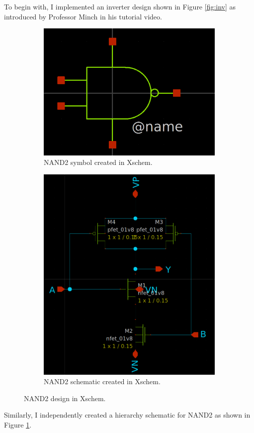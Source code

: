 \documentclass[11pt]{article}
\begin{document}
    To begin with, I implemented an inverter design shown in Figure \ref{fig:inv} as introduced by Professor Minch in his tutorial video.
    \begin{figure}[!ht]
        \begin{subfigure}{0.5\linewidth}
            \includegraphics[width=\linewidth]{../img/NAND2_sym.png}
            \caption{NAND2 symbol created in Xschem.}
        \end{subfigure}
        \begin{subfigure}{0.5\linewidth}
            \includegraphics[width=\linewidth]{../img/NAND2_sch.png}
            \caption{NAND2 schematic created in Xschem.}
        \end{subfigure}
        \caption{NAND2 design in Xschem.}
        \label{fig:nand2}
    \end{figure}
    Similarly, I independently created a hierarchy schematic for NAND2 as shown in Figure \ref{fig:nand2}.
\end{document}
